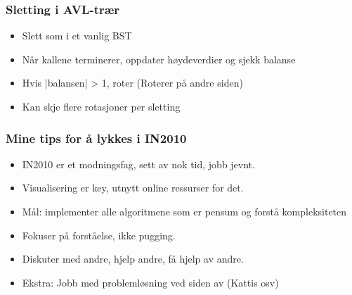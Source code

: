 \documentclass[norsk, handout]{beamer}
\begin{document}
    \begin{frame}
        \frametitle{Sletting i AVL-trær}

        \begin{itemize}
            \item Slett som i et vanlig BST
            \item Når kallene terminerer, oppdater høydeverdier og sjekk balanse
            \item Hvis |balansen| > 1, roter (Roterer på andre siden)
            \item Kan skje flere rotasjoner per sletting
        \end{itemize}
    \end{frame}

    \begin{frame}
        \frametitle{Mine tips for å lykkes i IN2010}
        \begin{itemize}
            \item IN2010 er et modningsfag, sett av nok tid, jobb jevnt.
            \item Visualisering er key, utnytt online ressurser for det.
            \item Mål: implementer alle algoritmene som er pensum og forstå kompleksiteten
            \item Fokuser på forståelse, ikke pugging.
            \item Diskuter med andre, hjelp andre, få hjelp av andre.
            \item Ekstra: Jobb med problemløsning ved siden av (Kattis osv)
        \end{itemize}
    \end{frame}
\end{document}
